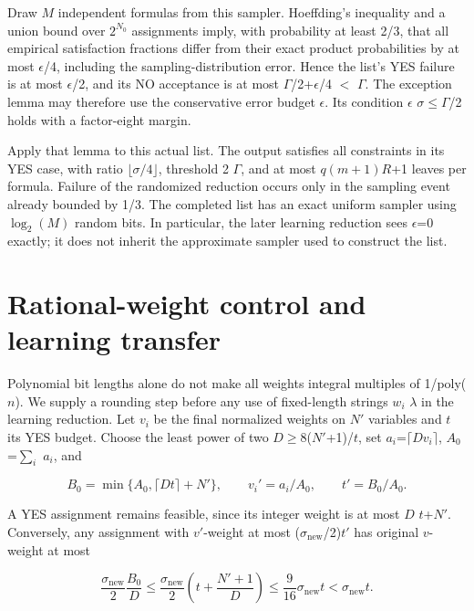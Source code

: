 Draw \(M\) independent formulas from this sampler. Hoeffding's inequality and a union bound over \(2^{N_0}\) assignments imply, with probability at least 2/3, that all empirical satisfaction fractions differ from their exact product probabilities by at most \(\epsilon\)/4, including the sampling-distribution error. Hence the list's YES failure is at most \(\epsilon\)/2, and its NO acceptance is at most \(\Gamma\)/2+\(\epsilon\)/4 \(<\) \(\Gamma\). The exception lemma may therefore use the conservative error budget \(\epsilon\). Its condition \(\epsilon\) \(\sigma\)\(\le\)\(\Gamma\)/2 holds with a factor-eight margin.

Apply that lemma to this actual list. The output satisfies all constraints in its YES case, with ratio \(\lfloor \sigma/4\rfloor\), threshold 2 \(\Gamma\), and at most \(q(m+1)\)\(R\)+1 leaves per formula. Failure of the randomized reduction occurs only in the sampling event already bounded by 1/3. The completed list has an exact uniform sampler using \(\log_2(M)\) random bits. In particular, the later learning reduction sees \(\epsilon\)=0 exactly; it does not inherit the approximate sampler used to construct the list.

\section{Rational-weight control and learning transfer}\label{sec:9}
Polynomial bit lengths alone do not make all weights integral multiples of 1/poly(\(n\)). We supply a rounding step before any use of fixed-length strings \(w_i\) \(\lambda\) in the learning reduction. Let \(v_i\) be the final normalized weights on \(N'\) variables and \(t\) its YES budget. Choose the least power of two \(D\)\(\ge\)8(\(N'\)+1)/\(t\), set \(a_i\)=\(\lceil D v_i\rceil\), \(A_0\)=\(\sum_i\) \(a_i\), and

\begin{equation}\label{eq:25}
B_0=\min\{A_0,\lceil Dt\rceil+N'\},\qquad v_i'=a_i/A_0,\qquad t'=B_0/A_0.
\end{equation}

A YES assignment remains feasible, since its integer weight is at most \(D\) \(t\)+\(N'\). Conversely, any assignment with \(v'\)-weight at most (\(\sigma_{\mathrm{new}}\)/2)\(t'\) has original \(v\)-weight at most

\begin{equation}\label{eq:26}
\frac{\sigma_{\mathrm{new}}}{2}\frac{B_0}{D}\le\frac{\sigma_{\mathrm{new}}}{2}\left(t+\frac{N'+1}{D}\right)\le\frac9{16}\sigma_{\mathrm{new}}t<\sigma_{\mathrm{new}}t.
\end{equation}

